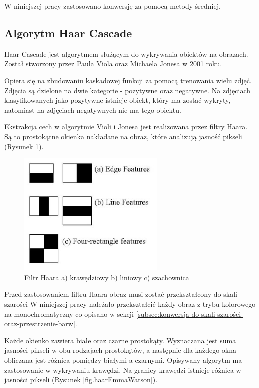 \documentclass[a4paper,twoside,12pt]{book}
\begin{document}
    W niniejszej pracy zastosowano konwersję za pomocą metody średniej.
    \subsection{Algorytm Haar Cascade}\label{subsec:algorytm-haar-cascade}

    Haar Cascade jest algorytmem służącym do wykrywania obiektów na obrazach.
    Został stworzony przez Paula Viola oraz Michaela Jonesa w 2001 roku\cite{violaJones}.

    Opiera się na zbudowaniu kaskadowej funkcji za pomocą trenowania wielu zdjęć.
    Zdjęcia są dzielone na
    dwie kategorie - pozytywne oraz negatywne.
    Na zdjęciach klasyfikowanych jako pozytywne istnieje obiekt, który ma zostać wykryty, natomiast
    na zdjęciach negatywnych nie ma tego obiektu.

    Ekstrakcja cech w algorytmie Violi i Jonesa jest realizowana przez filtry Haara.
    Są to prostokątne okienka
    nakładane na obraz, które analizują jasność pikseli (Rysunek \ref{fig.haarRectangles}).
    \begin{figure}
        \centering
        \includegraphics[width=7cm]{Obrazy/Haar_filter_rectangles.jpg}
        \caption{Filtr Haara a) krawędziowy b) liniowy c) szachownica \cite{haar}}
        \label{fig.haarRectangles}
    \end{figure}

    Przed zastosowaniem filtru Haara obraz musi zostać przekształcony do skali szarości
    W niniejszej pracy należało przekształcić każdy obraz z trybu kolorowego na monochromatyczny co opisano w sekcji
    \ref{subsec:konwersja-do-skali-szarości-oraz-przestrzenie-barw}.

    Każde okienko zawiera białe oraz czarne prostokąty.
    Wyznaczana jest suma jasności pikseli w obu rodzajach prostokątów, a
    następnie dla każdego okna obliczana jest różnica pomiędzy białymi a czarnymi.
    Opisywany algorytm ma zastosowanie w wykrywaniu krawędzi.
    Na granicy krawędzi istnieje różnica w jasności pikseli
    (Rysunek \ref{fig.haarEmmaWatson}).
\end{document}
